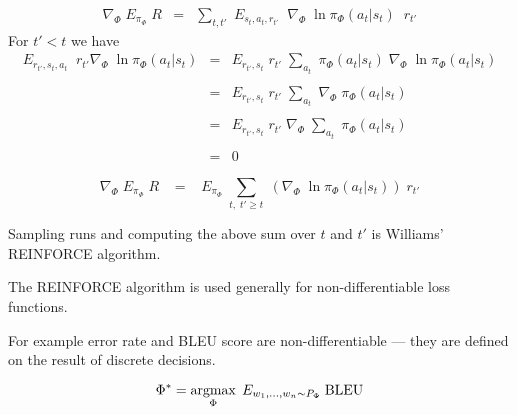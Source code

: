 {

\begin{eqnarray*}
    \nabla_\Phi \; E_{\pi_\Phi}\; R  & = & \sum_{t,t'}\;E_{s_t,a_t,r_{t'}}\;\; \nabla_\Phi\;\ln \pi_\Phi(a_{t}|s_{t})\;\;r_{t'}
    \end{eqnarray*}
For $t' < t$ we have
{\huge
\begin{eqnarray*}
    E_{r_{t'},s_t,a_t}\;\; r_{t'} \nabla_\Phi\;\ln \pi_\Phi(a_t|s_t)  & =  & E_{r_{t'},s_t}\; r_{t'}  \;\sum_{a_t} \; \pi_\Phi(a_t|s_t)\; \nabla_\Phi\;\ln \pi_\Phi(a_t|s_t) \\
    \\
    & =  & E_{r_{t'},s_t}\; r_{t'}  \;\sum_{a_t}\; \nabla_\Phi\; \pi_\Phi(a_t|s_t) \\
    \\
    & =  & E_{r_{t'},s_t}\; r_{t'}  \;\nabla_\Phi\; \sum_{a_t}\;\pi_\Phi(a_t|s_t) \\
    \\
    & = & 0
\end{eqnarray*}
}

$$\nabla_\Phi \;E_{\pi_\Phi}\;R \;\;\; = \;\;\; E_{\pi_\Phi}\; \sum_{t,\;t' \geq t} \; \left(\nabla_\Phi\;\ln \pi_\Phi(a_t|s_t)\right) \;r_{t'}$$

\vfill
Sampling runs and computing the above sum over $t$ and $t'$ is Williams' REINFORCE algorithm.


The REINFORCE algorithm is used generally for non-differentiable loss functions.

\vfill
For example error rate and BLEU score are non-differentiable --- they are defined on the result of discrete decisions.

\vfill
$$\Phi^* = \operatorname*{argmax}_\Phi \;E_{w_1,\ldots,w_n \sim P_\Phi}\;\mathrm{BLEU}$$




}



